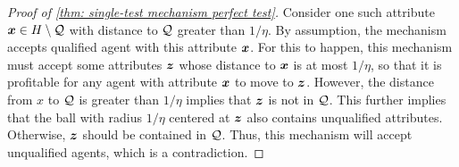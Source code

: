 \begin{proof}[Proof of \cref{thm: single-test mechanism perfect test}]
    Consider one such attribute $\boldsymbol{x} \in H \setminus \mathcal{Q}$ with distance to $\mathcal{Q}$ greater than $1/\eta$. 
    By assumption, the mechanism accepts qualified agent with this attribute $\boldsymbol{x}$.
    For this to happen, this mechanism must accept some attributes $\boldsymbol{z}$ whose  distance to $\boldsymbol{x}$ is at most $1/\eta$, so that it is profitable for any agent with attribute $\boldsymbol{x}$ to move to $\boldsymbol{z}$. 
    However, the distance from $x$ to $\mathcal{Q}$ is greater than $1/\eta$ implies that $\boldsymbol{z}$ is not in $\mathcal{Q}$.
    This further implies that the ball with radius $1/\eta$ centered at $\boldsymbol{z}$ also contains unqualified attributes. Otherwise, $\boldsymbol{z}$ should be contained in $\mathcal{Q}$.
    Thus, this mechanism will accept unqualified agents, which is a contradiction.   

    
\end{proof}

